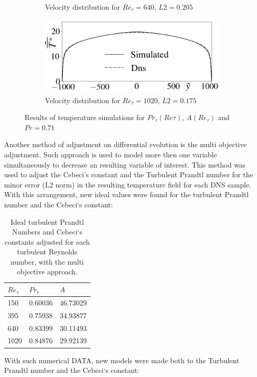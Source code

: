 \documentclass[10pt]{article} %
\begin{document}
\begin{figure}[!h]
\begin{subfigure}[t]{0.5\textwidth}
		\caption{Velocity distribution for $Re_\tau = 640$, $L2 = 0.205$}
	\end{subfigure}
	\begin{subfigure}[t]{0.45\textwidth}
		\centering
		\includegraphics[angle=0, scale=0.24]{fotos_formatacao_final/Temperature_1000_071_Prt(Ret)_Avelocity}
		\caption{Velocity distribution for $Re_\tau = 1020$, $L2 = 0.175$}
	\end{subfigure}	
	\caption{Results of temperature simulations for $Pr_\tau(Re\tau)$, $A(Re_\tau)$ and $Pr =0.71$ }
\end{figure}

Another method of adjustment on differential evolution is the multi objective adjustment. Such approach is used to model more then one variable simultaneously to decrease an resulting variable of interest. This method was used to adjust the Cebeci's constant and the Turbulent Prandtl number for the minor error (L2 norm) in the resulting temperature field for each DNS sample. With this arrangement, new ideal values were found for the turbulent Prandtl number and the Cebeci`s constant:

\begin{table}[!h]
	\centering
	\caption{Ideal turbulent Prandtl Numbers and Cebeci`s constants adjusted for each turbulent Reynolds number, with the multi objective approach. }
	\begin{tabular}{lll}
		\hline
		$Re_\tau$ & $Pr_t$ & $A$\\
		\hline
		150  &   0.60036 & 46.73029 \\
		395  &   0.75938 & 34.93877 \\
		640  &   0.83399 & 30.11493 \\
		1020 &   0.84876 & 29.92139 \\ 
		\hline
	\end{tabular}
\end{table}
With such numerical DATA, new models were made both to the Turbulent Prandtl number and the Cebeci`s constant:
\end{document}
